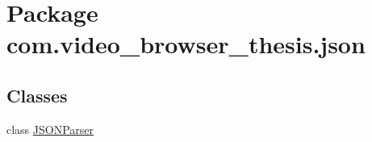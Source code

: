 \hypertarget{namespacecom_1_1video__browser__thesis_1_1json}{\section{Package com.\-video\-\_\-browser\-\_\-thesis.\-json}
\label{namespacecom_1_1video__browser__thesis_1_1json}
}
\subsection*{Classes}
\begin{DoxyCompactItemize}
\item 
class \hyperlink{classcom_1_1video__browser__thesis_1_1json_1_1_j_s_o_n_parser}{J\-S\-O\-N\-Parser}
\end{DoxyCompactItemize}
